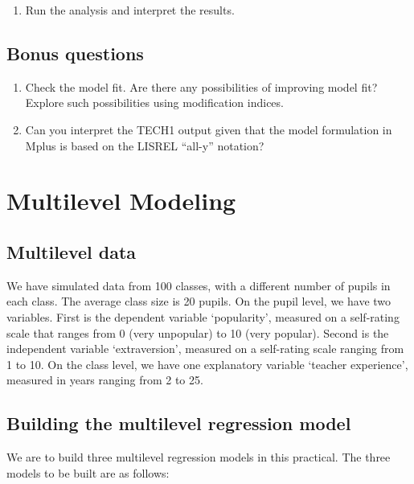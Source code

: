 \documentclass[
]{book}
\providecommand{\tightlist}{%
  \setlength{\itemsep}{0pt}\setlength{\parskip}{0pt}}
\begin{document}
\begin{enumerate}
\def\labelenumi{\arabic{enumi}.}
\setcounter{enumi}{2}
\tightlist
\item
  Run the analysis and interpret the results.
\end{enumerate}

\section{Bonus questions}\label{bonus-questions-2}

\begin{enumerate}
\def\labelenumi{\arabic{enumi}.}
\item
  Check the model fit. Are there any possibilities of improving model fit? Explore such possibilities using modification indices.
\item
  Can you interpret the TECH1 output given that the model formulation in Mplus is based on the LISREL ``all-y'' notation?
\end{enumerate}

\chapter{Multilevel Modeling}\label{multilevel-modeling}

\section{Multilevel data}\label{multilevel-data}

We have simulated data from 100 classes, with a different number of pupils in each class. The average class size is 20 pupils. On the pupil level, we have two variables. First is the dependent variable `popularity', measured on a self-rating scale that ranges from 0 (very unpopular) to 10 (very popular). Second is the independent variable `extraversion', measured on a self-rating scale ranging from 1 to 10. On the class level, we have one explanatory variable `teacher experience', measured in years ranging from 2 to 25.

\section{Building the multilevel regression model}\label{building-the-multilevel-regression-model}

We are to build three multilevel regression models in this practical. The three models to be built are as follows:
\end{document}
